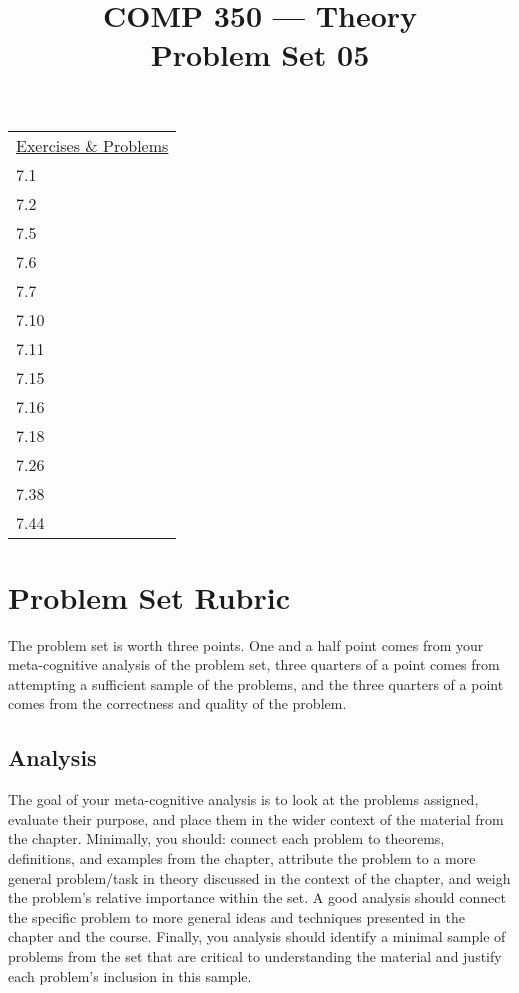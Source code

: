 \documentclass[nobib]{tufte-handout}
\title{COMP 350 --- Theory \\ Problem Set 05}
\begin{document}
\maketitle

\begin{center}
\begin{tabular}{l}
  \underline{Exercises \& Problems} \\
    7.1 \\
    7.2 \\
    7.5 \\
    7.6 \\
    7.7 \\
    7.10 \\
    7.11 \\
    7.15 \\
    7.16 \\
    7.18 \\
    7.26 \\
    7.38 \\
    7.44 \\
\end{tabular}
\end{center}


\section*{Problem Set Rubric}

The problem set is worth three points.  One and a half point comes from your meta-cognitive analysis of the problem set, three quarters of a point comes from attempting a sufficient sample of the problems, and the three quarters of a point comes from the correctness and quality of the problem.

\subsection*{Analysis}

The goal of your meta-cognitive analysis is to look at the problems assigned, evaluate their purpose, and place them in the wider context of the material from the chapter. Minimally, you should: connect each problem to theorems, definitions, and examples from the chapter, attribute the problem to a more general problem/task in theory discussed in the context of the chapter, and weigh the problem's relative importance within the set. A good analysis should connect the specific problem to more general ideas and techniques presented in the chapter and the course. Finally, you analysis should identify a minimal sample of problems from the set that are critical to understanding the material and justify each problem's inclusion in this sample.
\end{document}
